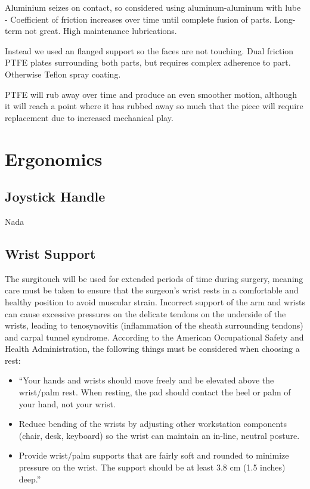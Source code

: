 Aluminium seizes on contact, so considered using aluminum-aluminum with lube - Coefficient of friction increases over time until complete fusion of parts. Long-term not great. High maintenance lubrications.

Instead we used an flanged support so the faces are not touching.
Dual friction PTFE plates surrounding both parts, but requires complex adherence to part.
Otherwise Teflon spray coating.

PTFE will rub away over time and produce an even smoother motion, although it will reach a point where it has rubbed away so much that the piece will require replacement due to increased mechanical play.





\section{Ergonomics} %
\label{sec:ergonomics}

\subsection{Joystick Handle} %
\label{sub:joystick_handle}

Nada


\subsection{Wrist Support} %
\label{sub:wrist_support}

The surgitouch will be used for extended periods of time during surgery, meaning care must be taken to ensure that the surgeon’s wrist rests in a comfortable and healthy position to avoid muscular strain. Incorrect support of the arm and wrists can cause excessive pressures on the delicate tendons on the underside of the wrists, leading to tenosynovitis (inflammation of the sheath surrounding tendons) and carpal tunnel syndrome. According to the American Occupational Safety and Health Administration, the following things must be considered when choosing a rest:

\begin{itemize}
  \item “Your hands and wrists should move freely and be elevated above the wrist/palm rest. When resting, the pad should contact the heel or palm of your hand, not your wrist.
  \item Reduce bending of the wrists by adjusting other workstation components (chair, desk, keyboard) so the wrist can maintain an in-line, neutral posture.
  \item Provide wrist/palm supports that are fairly soft and rounded to minimize pressure on the wrist. The support should be at least 3.8 cm (1.5 inches) deep.”
\end{itemize}

